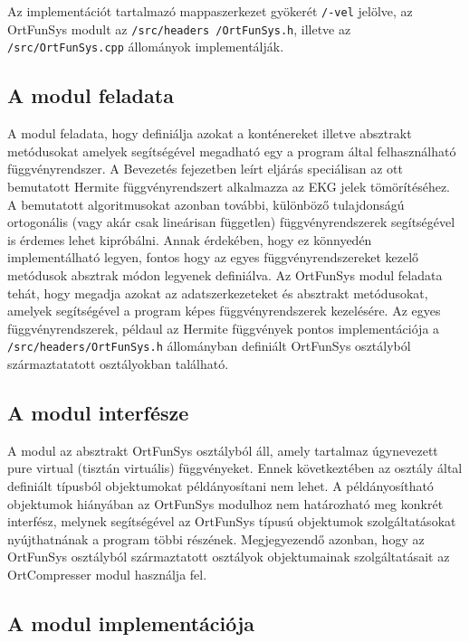\documentclass[oneside,titlepage,12pt,a4paper]{report}
\begin{document}
Az implementációt tartalmazó mappaszerkezet gyökerét \texttt{/-vel} jelölve, az OrtFunSys modult  az \texttt{/src/headers
/OrtFunSys.h}, illetve az \texttt{/src/OrtFunSys.cpp} állományok implementálják.

\subsection*{A modul feladata}

\par A modul feladata, hogy definiálja azokat a konténereket illetve absztrakt metódusokat amelyek segítségével 
megadható egy a program által felhasználható függvényrendszer. A Bevezetés fejezetben leírt eljárás speciálisan az ott bemutatott Hermite függvényrendszert 
alkalmazza az EKG jelek tömörítéséhez. A bemutatott algoritmusokat azonban további, különböző tulajdonságú ortogonális (vagy akár csak lineárisan független) 
függvényrendszerek segítségével is érdemes lehet kipróbálni. Annak érdekében, hogy ez könnyedén implementálható legyen, fontos hogy az egyes függvényrendszereket kezelő metódusok absztrak módon legyenek definiálva.
Az OrtFunSys modul feladata tehát, hogy megadja azokat az adatszerkezeteket és absztrakt metódusokat, amelyek segítségével a program képes függvényrendszerek kezelésére. Az egyes függvényrendszerek, példaul az Hermite függvények pontos implementációja
a \texttt{/src/headers/OrtFunSys.h} állományban definiált OrtFunSys osztályból származtatatott osztályokban található. 


\subsection*{A modul interfésze}

\par A modul az absztrakt OrtFunSys osztályból áll, amely tartalmaz úgynevezett pure virtual (tisztán virtuális) függvényeket. Ennek következtében az osztály által definiált típusból objektumokat példányosítani nem lehet. A példányosítható objektumok hiányában
az OrtFunSys modulhoz nem határozható meg konkrét interfész, melynek segítségével az OrtFunSys típusú objektumok szolgáltatásokat nyújthatnának a program többi részének. Megjegyezendő azonban, hogy az OrtFunSys osztályból származtatott osztályok objektumainak szolgáltatásait az OrtCompresser
modul használja fel. 

\subsection*{A modul implementációja}
\end{document}
